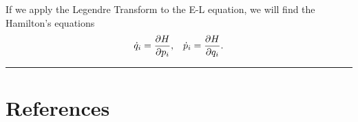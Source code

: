 \documentclass[a4paper]{article}
\numberwithin{equation}{subsection}
\begin{document}
If we apply the Legendre Transform to the E-L equation, we will find the Hamilton's equations
\begin{align}
    \dot{q}_i = \pdv{H}{p_i}, && \dot{p}_i = \pdv{H}{q_i}.
\end{align}
\par\noindent\rule{\textwidth}{0.4pt}










\newpage
\section*{References}
%
\printbibliography[heading = none]
\end{document}
